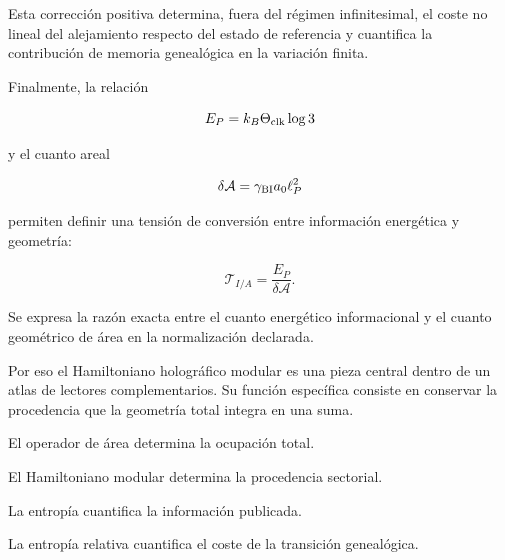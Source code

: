 Esta corrección positiva determina, fuera del régimen infinitesimal, el coste no lineal del alejamiento respecto del estado de referencia y cuantifica la contribución de memoria genealógica en la variación finita.\par

Finalmente, la relación\par

\[
E_P=k_B\Theta_{\rm clk}\log3
\]

y el cuanto areal\par

\[
\delta\mathcal A
=
\gamma_{\rm BI}a_0\ell_P^2
\]

permiten definir una tensión de conversión entre información energética y geometría:\par

\[
\mathcal T_{I/A}
=
\frac{E_P}{\delta\mathcal A}.
\]

Se expresa la razón exacta entre el cuanto energético informacional y el cuanto geométrico de área en la normalización declarada.\par

Por eso el Hamiltoniano holográfico modular es una pieza central dentro de un atlas de lectores complementarios. Su función específica consiste en conservar la procedencia que la geometría total integra en una suma.\par

El operador de área determina la ocupación total.\par
El Hamiltoniano modular determina la procedencia sectorial.\par
La entropía cuantifica la información publicada.\par
La entropía relativa cuantifica el coste de la transición genealógica.\par
